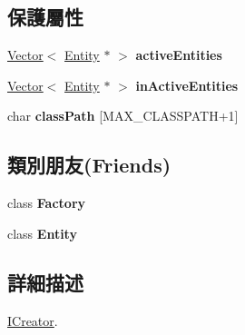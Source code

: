 \subsection*{保護屬性}
\begin{DoxyCompactItemize}
\item 
\hyperlink{class_magnum_1_1_vector}{Vector}$<$ \hyperlink{class_magnum_1_1_entity}{Entity} $\ast$ $>$ {\bfseries active\+Entities}\hypertarget{class_magnum_1_1_entity_1_1_i_creator_aab3ba57b637934b03eb850e0f465351d}{}\label{class_magnum_1_1_entity_1_1_i_creator_aab3ba57b637934b03eb850e0f465351d}

\item 
\hyperlink{class_magnum_1_1_vector}{Vector}$<$ \hyperlink{class_magnum_1_1_entity}{Entity} $\ast$ $>$ {\bfseries in\+Active\+Entities}\hypertarget{class_magnum_1_1_entity_1_1_i_creator_a0e49dcda1f8f1251b116e36897a51ce7}{}\label{class_magnum_1_1_entity_1_1_i_creator_a0e49dcda1f8f1251b116e36897a51ce7}

\item 
char {\bfseries class\+Path} \mbox{[}M\+A\+X\+\_\+\+C\+L\+A\+S\+S\+P\+A\+TH+1\mbox{]}\hypertarget{class_magnum_1_1_entity_1_1_i_creator_af03addfe4807529ae6a98db02f2f0885}{}\label{class_magnum_1_1_entity_1_1_i_creator_af03addfe4807529ae6a98db02f2f0885}

\end{DoxyCompactItemize}
\subsection*{類別朋友(Friends)}
\begin{DoxyCompactItemize}
\item 
class {\bfseries Factory}\hypertarget{class_magnum_1_1_entity_1_1_i_creator_a328c093d609680cca505905c6d49901a}{}\label{class_magnum_1_1_entity_1_1_i_creator_a328c093d609680cca505905c6d49901a}

\item 
class {\bfseries Entity}\hypertarget{class_magnum_1_1_entity_1_1_i_creator_a614439ccac0344926adc4c0165d64060}{}\label{class_magnum_1_1_entity_1_1_i_creator_a614439ccac0344926adc4c0165d64060}

\end{DoxyCompactItemize}


\subsection{詳細描述}
\hyperlink{class_magnum_1_1_entity_1_1_i_creator}{I\+Creator}. 

